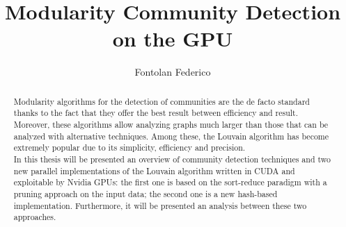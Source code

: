 \documentclass[12pt,a4paper,titlepage]{article}
\title{Modularity Community Detection on the GPU}
\author{Fontolan Federico}
\begin{document}
	
	
	\begin{abstract}
		Modularity algorithms for the detection of communities are the de facto standard thanks to the fact that they offer the best result between efficiency and result. \\
		Moreover, these algorithms allow analyzing graphs much larger than those that can be analyzed with alternative techniques. Among these, the Louvain algorithm has become extremely popular due to its simplicity, efficiency and precision.\\
		In this thesis will be presented an overview of community detection techniques and two new parallel implementations of the Louvain algorithm written in CUDA and exploitable by Nvidia GPUs: the first one is based on the sort-reduce paradigm with a pruning approach on the input data; the second one is a new hash-based implementation. Furthermore, it will be presented an analysis between these two approaches.
	\end{abstract}

	\tableofcontents
	\newpage
	
	\newpage
	
	\newpage
	
	\newpage
	
	\newpage
	
	\newpage
	
	\newpage
	
	\newpage
	\printbibliography
\end{document}

